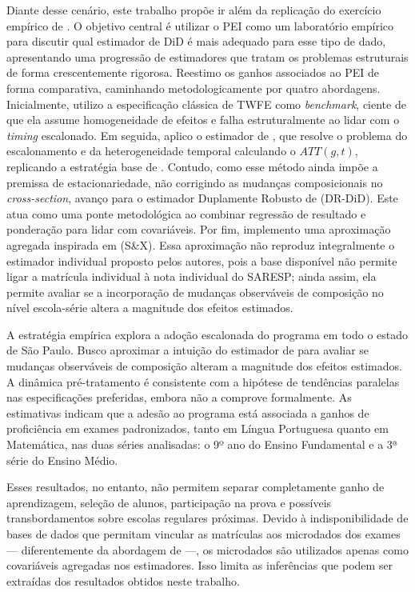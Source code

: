 Diante desse cenário, este trabalho propõe ir além da replicação do exercício empírico de \textcite{scorzafave2023}. O objetivo central é utilizar o PEI como um laboratório empírico para discutir qual estimador de DiD é mais adequado para esse tipo de dado, apresentando uma progressão de estimadores que tratam os problemas estruturais de forma crescentemente rigorosa. Reestimo os ganhos associados ao PEI de forma comparativa, caminhando metodologicamente por quatro abordagens. Inicialmente, utilizo a especificação clássica de TWFE como \textit{benchmark}, ciente de que ela assume homogeneidade de efeitos e falha estruturalmente ao lidar com o \textit{timing} escalonado. Em seguida, aplico o estimador de \textcite{callawaysantanna}, que resolve o problema do escalonamento e da heterogeneidade temporal calculando o $ATT(g,t)$, replicando a estratégia base de \textcite{scorzafave2023}. Contudo, como esse método ainda impõe a premissa de estacionariedade, não corrigindo as mudanças composicionais no \textit{cross-section}, avanço para o estimador Duplamente Robusto de \textcite{santannazhao} (DR-DiD). Este atua como uma ponte metodológica ao combinar regressão de resultado e ponderação para lidar com covariáveis. Por fim, implemento uma aproximação agregada inspirada em \textcite{santannaxu} (S\&X). Essa aproximação não reproduz integralmente o estimador individual proposto pelos autores, pois a base disponível não permite ligar a matrícula individual à nota individual do SARESP; ainda assim, ela permite avaliar se a incorporação de mudanças observáveis de composição no nível escola-série altera a magnitude dos efeitos estimados.

A estratégia empírica explora a adoção escalonada do programa em todo o estado de São Paulo. Busco aproximar a intuição do estimador de \textcite{santannaxu} para avaliar se mudanças observáveis de composição alteram a magnitude dos efeitos estimados. A dinâmica pré-tratamento é consistente com a hipótese de tendências paralelas nas especificações preferidas, embora não a comprove formalmente. As estimativas indicam que a adesão ao programa está associada a ganhos de proficiência em exames padronizados, tanto em Língua Portuguesa quanto em Matemática, nas duas séries analisadas: o 9º ano do Ensino Fundamental e a 3ª série do Ensino Médio.

Esses resultados, no entanto, não permitem separar completamente ganho de aprendizagem, seleção de alunos, participação na prova e possíveis transbordamentos sobre escolas regulares próximas. Devido à indisponibilidade de bases de dados que permitam vincular as matrículas aos microdados dos exames — diferentemente da abordagem de \textcite{scorzafave2023} —, os microdados são utilizados apenas como covariáveis agregadas nos estimadores. Isso limita as inferências que podem ser extraídas dos resultados obtidos neste trabalho.

